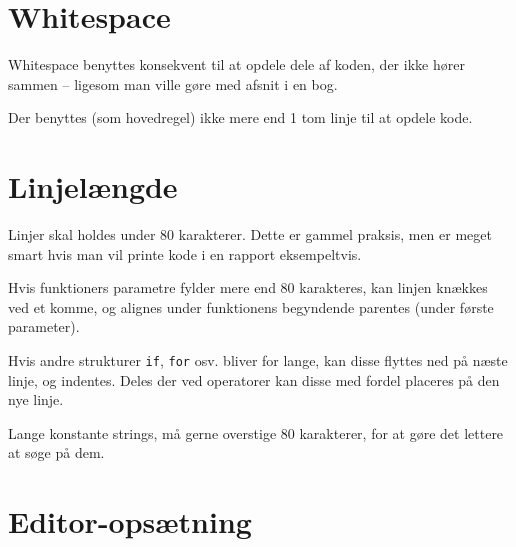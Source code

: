 \documentclass[article]{memoir}
\let\tempone\itemize
\let\temptwo\enditemize
\renewenvironment{itemize}{\tempone\firmlist}{\temptwo}
\begin{document}
\section{Whitespace}
\begin{itemize}
    \item Whitespace benyttes konsekvent til at opdele dele af koden, der ikke hører sammen -- ligesom man ville gøre med afsnit i en bog.
    \item Der benyttes (som hovedregel) ikke mere end 1 tom linje til at opdele kode.
\end{itemize}

\section{Linjelængde}
\begin{itemize}
    \item Linjer skal holdes under 80 karakterer. Dette er gammel praksis, men er meget smart hvis man vil printe kode i en rapport eksempeltvis.
    \item Hvis funktioners parametre fylder mere end 80 karakteres, kan linjen knækkes ved et komme, og alignes under funktionens begyndende parentes (under første parameter).
    \item Hvis andre strukturer \texttt{if}, \texttt{for} osv. bliver for lange, kan disse flyttes ned på næste linje, og indentes. Deles der ved operatorer kan disse med fordel placeres på den nye linje.
    \item Lange konstante strings, må gerne overstige 80 karakterer, for at gøre det lettere at søge på dem.
\end{itemize}

\section{Editor-opsætning}
\end{document}

